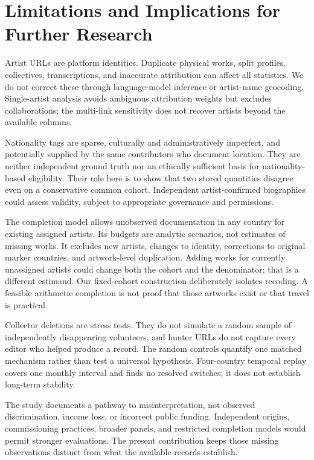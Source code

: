 \section{Limitations and Implications for Further Research}
Artist URLs are platform identities. Duplicate physical works, split profiles, collectives, transcriptions, and inaccurate attribution can affect all statistics. We do not correct these through language-model inference or artist-name geocoding. Single-artist analysis avoids ambiguous attribution weights but excludes collaborations; the multi-link sensitivity does not recover artists beyond the available columns.

Nationality tags are sparse, culturally and administratively imperfect, and potentially supplied by the same contributors who document location. They are neither independent ground truth nor an ethically sufficient basis for nationality-based eligibility. Their role here is to show that two stored quantities disagree even on a conservative common cohort. Independent artist-confirmed biographies could assess validity, subject to appropriate governance and permissions.

The completion model allows unobserved documentation in any country for existing assigned artists. Its budgets are analytic scenarios, not estimates of missing works. It excludes new artists, changes to identity, corrections to original marker countries, and artwork-level duplication. Adding works for currently unassigned artists could change both the cohort and the denominator; that is a different estimand. Our fixed-cohort construction deliberately isolates recoding. A feasible arithmetic completion is not proof that those artworks exist or that travel is practical.

Collector deletions are stress tests. They do not simulate a random sample of independently disappearing volunteers, and hunter URLs do not capture every editor who helped produce a record. The random controls quantify one matched mechanism rather than test a universal hypothesis. Four-country temporal replay covers one monthly interval and finds no resolved switches; it does not establish long-term stability.

The study documents a pathway to misinterpretation, not observed discrimination, income loss, or incorrect public funding. Independent origins, commissioning practices, broader panels, and restricted completion models would permit stronger evaluations. The present contribution keeps those missing observations distinct from what the available records establish.


